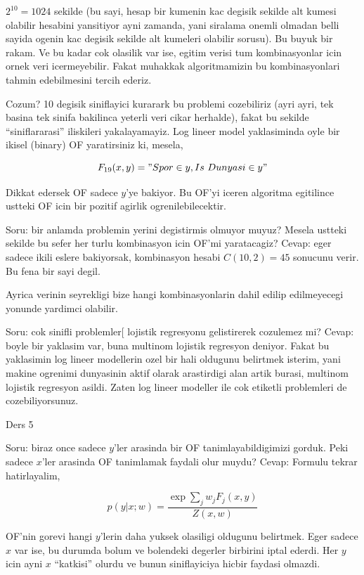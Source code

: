\documentclass[12pt,fleqn]{article}\usepackage{../common}
\begin{document}
$2^{10} = 1024$ sekilde (bu sayi, hesap bir kumenin kac degisik sekilde alt
kumesi olabilir hesabini yansitiyor ayni zamanda, yani siralama onemli
olmadan belli sayida ogenin kac degisik sekilde alt kumeleri olabilir
sorusu). Bu buyuk bir rakam. Ve bu kadar cok olasilik var ise, egitim
verisi tum kombinasyonlar icin ornek veri icermeyebilir. Fakat muhakkak
algoritmamizin bu kombinasyonlari tahmin edebilmesini tercih ederiz.

Cozum? 10 degisik siniflayici kurarark bu problemi cozebiliriz (ayri ayri,
tek basina tek sinifa bakilinca yeterli veri cikar herhalde), fakat bu
sekilde ``siniflararasi'' iliskileri yakalayamayiz. Log lineer model
yaklasiminda oyle bir ikisel (binary) OF yaratirsiniz ki, mesela,

$$F_{19}(x,y) = "Spor \in y, Is \ Dunyasi \in y" $$ 

Dikkat edersek OF sadece $y$'ye bakiyor. Bu OF'yi iceren algoritma
egitilince ustteki OF icin bir pozitif agirlik ogrenilebilecektir. 

Soru: bir anlamda problemin yerini degistirmis olmuyor muyuz? Mesela
ustteki sekilde bu sefer her turlu kombinasyon icin OF'mi yaratacagiz?
Cevap: eger sadece ikili eslere bakiyorsak, kombinasyon hesabi 
$C(10,2) =
45$ sonucunu verir. Bu fena bir sayi degil.

Ayrica verinin seyrekligi bize hangi kombinasyonlarin dahil edilip
edilmeyecegi yonunde yardimci olabilir. 

Soru: cok sinifli problemler[ lojistik regresyonu gelistirerek cozulemez
mi?  Cevap: boyle bir yaklasim var, buna multinom lojistik regresyon
deniyor. Fakat bu yaklasimin log lineer modellerin ozel bir hali oldugunu
belirtmek isterim, yani makine ogrenimi dunyasinin aktif olarak arastirdigi
alan artik burasi, multinom lojistik regresyon asildi. Zaten log lineer
modeller ile cok etiketli problemleri de cozebiliyorsunuz.

Ders 5

Soru: biraz once sadece $y$'ler arasinda bir OF tanimlayabildigimizi
gorduk. Peki sadece $x$'ler arasinda OF tanimlamak faydali olur muydu?
Cevap: Formulu tekrar hatirlayalim,

$$ p(y|x;w) = \frac{\exp \sum_j w_j F_j (x,y)}{Z(x,w)} $$

OF'nin gorevi hangi $y$'lerin daha yuksek olasiligi oldugunu
belirtmek. Eger sadece $x$ var ise, bu durumda bolum ve bolendeki degerler
birbirini iptal ederdi. Her $y$ icin ayni $x$ ``katkisi'' olurdu ve bunun
siniflayiciya hicbir faydasi olmazdi. 
\end{document}
